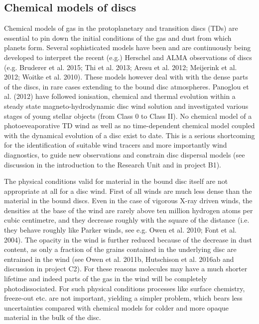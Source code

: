 \documentclass[10pt,fleqn,twoside]{article}
\newcommand{\Tcol}{\color{blue}}
\begin{document}
\subsection{\Tcol Chemical models of discs}

Chemical models of gas in the protoplanetary and transition discs (TDs) are essential to pin down the initial conditions of the gas and dust from which planets form. Several sophisticated models have been and are continuously being developed to interpret the recent (e.g.) Herschel and ALMA observations of discs (e.g. Bruderer et al. 2015; Thi et al. 2013; Aresu et al. 2012; Meijerink et al. 2012; Woitke et al. 2010). These models however deal with with the dense parts of the discs, in rare cases extending to the bound disc atmospheres. Panoglou et al. (2012) have followed ionisation, chemical and thermal evolution within a steady state magneto-hydrodynamic disc wind solution and investigated various stages of young stellar objects (from Class 0 to Class II).  No chemical model of a photoeveaporative TD wind as well as no time-dependent chemical model coupled with the dynamical evolution of a disc exist to date. This is a serious shortcoming for the identification of suitable wind tracers and more importantly wind diagnostics, to guide new observations and constrain disc dispersal models (see discussion in the introduction to the Research Unit and in project B1). 

The physical conditions valid for material in the bound disc itself are not appropriate at all for a disc wind. First of all winds are much less dense than the material in the bound discs. Even in the case of vigorous X-ray driven winds, the densities at the base of the wind are rarely above ten million hydrogen atoms per cubic centimetre, and they decrease roughly with the square of the distance (i.e. they behave roughly like Parker winds, see e.g. Owen et al. 2010; Font et al. 2004). The opacity in the wind is further reduced because of the decrease in dust content, as only a fraction of the grains contained in the underlying disc are entrained in the wind (see Owen et al. 2011b, Hutschison et al. 2016ab and discussion in project C2). For these reasons molecules may have a much shorter lifetime and indeed parts of the gas in the wind will be completely photodissociated. For such physical conditions processes like surface chemistry, freeze-out etc. are not important, yielding a simpler problem, which bears less uncertainties compared with chemical models for colder and more opaque material in the bulk of the disc. 
\end{document}
